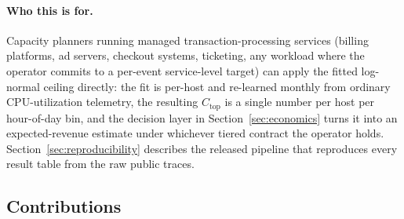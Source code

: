 \documentclass[11pt,a4paper]{article}
\newcommand{\Ctop}{C_{\text{top}}}
\begin{document}
\paragraph{Who this is for.} Capacity planners running managed
transaction-processing services (billing platforms, ad servers, checkout
systems, ticketing, any workload where the operator commits to a per-event
service-level target) can apply the fitted log-normal ceiling directly:
the fit is per-host and re-learned monthly from ordinary CPU-utilization
telemetry, the resulting $\Ctop$ is a single number per host per
hour-of-day bin, and the decision layer in Section~\ref{sec:economics}
turns it into an expected-revenue estimate under whichever tiered
contract the operator holds. Section~\ref{sec:reproducibility} describes
the released pipeline that reproduces every result table from the raw
public traces.

\subsection*{Contributions}
\end{document}
